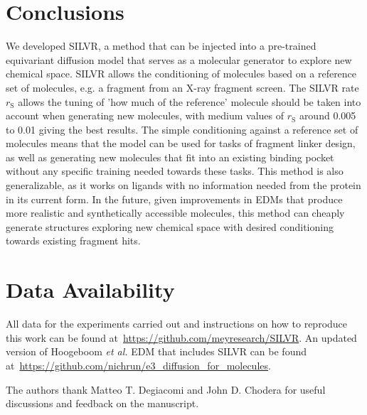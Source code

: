 \documentclass[journal=jacsat,manuscript=article]{achemso}
\begin{document}
\section{Conclusions}
We developed SILVR, a method that can be injected into a pre-trained equivariant diffusion model that serves as a molecular generator to explore new chemical space. SILVR allows the conditioning of molecules based on a reference set of molecules, e.g. a fragment from an X-ray fragment screen. The SILVR rate $r_{\mathrm{S}}$ allows the tuning of 'how much of the reference' molecule should be taken into account when generating new molecules, with medium values of $r_{\mathrm{S}}$ around 0.005 to 0.01 giving the best results. The simple conditioning against a reference set of molecules means that the model can be used for tasks of fragment linker design, as well as generating new molecules that fit into an existing binding pocket without any specific training needed towards these tasks. This method is also generalizable, as it works on ligands with no information needed from the protein in its current form. In the future, given improvements in EDMs that produce more realistic and synthetically accessible molecules, this method can cheaply generate structures exploring new chemical space with desired conditioning towards existing fragment hits.

\section{Data Availability}
All data for the experiments carried out and instructions on how to reproduce this work can be found at~\url{https://github.com/meyresearch/SILVR}. An updated version of Hoogeboom \textit{et al.} EDM that includes SILVR can be found at~\url{https://github.com/nichrun/e3_diffusion_for_molecules}.

\begin{acknowledgement}
The authors thank Matteo T. Degiacomi and John D. Chodera for useful discussions and feedback on the manuscript. 
\end{acknowledgement}



%
\printbibliography
\end{document}
